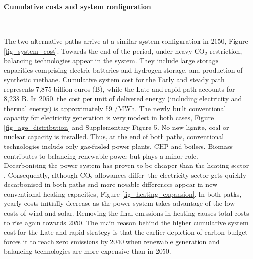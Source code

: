 \documentclass[5p]{elsarticle} %
\begin{document}
\paragraph{\textbf{Cumulative costs and system configuration}} \

The two alternative paths arrive at a similar system configuration in 2050, Figure \ref{fig_system_cost}. Towards the end of the period, under heavy CO$_2$ restriction, balancing technologies appear in the system. They include large storage capacities comprising electric batteries and hydrogen storage, and production of synthetic methane.  Cumulative system cost for the Early and steady path represents 7,875 billion euros (B\EUR), while the Late and rapid path accounts for 8,238 B\EUR. In 2050, the cost per unit of delivered energy (including electricity and thermal energy) is approximately 59 \EUR /MWh. The newly built conventional capacity for electricity generation is very modest in both cases, Figure \ref{fig_age_distribution} and Supplementary Figure 5. No new lignite, coal or nuclear capacity is installed. Thus, at the end of both paths, conventional technologies include only gas-fueled power plants, CHP and boilers. Biomass contributes to balancing renewable power but plays a minor role. \\

Decarbonising the power system has proven to be cheaper than the heating sector \cite{Zhu_2019}. Consequently, although CO$_2$ allowances differ, the electricity sector gets quickly decarbonised in both paths and more notable differences appear in new conventional heating capacities, Figure \ref{fig_heating_expansion}. In both paths, yearly costs initially decrease as the power system takes advantage of the low costs of wind and solar. Removing the final emissions in heating causes total costs to rise again towards 2050. The main reason behind the higher cumulative system cost for the Late and rapid strategy is that the earlier depletion of carbon budget forces it to reach zero emissions by 2040 when renewable generation and balancing technologies are more expensive than in 2050.
\end{document}

